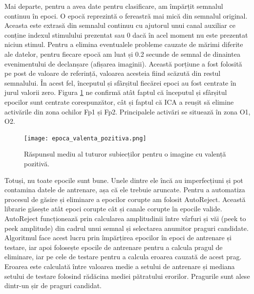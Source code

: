 Mai departe, pentru a avea date pentru clasificare, am împărțit semnalul continuu în epoci. O epocă reprezintă o fereastră mai mică din semnalul original. Aceasta este extrasă din semnalul continuu cu ajutorul unui canal auxiliar ce conține indexul stimulului prezentat sau 0 dacă în acel moment nu este prezentat niciun stimul. Pentru a elimina eventualele probleme cauzate de mărimi diferite ale datelor, pentru fiecare epocă am luat și 0.2 secunde de semnal de dinaintea evenimentului de declanșare (afișarea imaginii). Această porțiune a fost folosită pe post de valoare de referință, valoarea acesteia fiind scăzută din restul semnalului. În acest fel, începutul și sfârșitul fiecărei epoci au fost centrate în jurul valorii zero. Figura \ref{fig:raspuns_mediu} ne confirmă atât faptul că începutul și sfârșitul epocilor sunt centrate corespunzător, cât și faptul că ICA a reușit să elimine activările din zona ochilor Fp1 și Fp2. Principalele activări se situează în zona O1, O2.

\begin{figure}[H]
    \centering
		\vspace{-1em}
    \texttt{[image: epoca\_valenta\_pozitiva.png]}
    \caption{Răspunsul mediu al tuturor subiecților pentru o imagine cu valență pozitivă.}
		\vspace{-1em}
    \label{fig:raspuns_mediu}
\end{figure}

Totuși, nu toate epocile sunt bune. Unele dintre ele încă au imperfecțiuni și pot contamina datele de antrenare, așa că ele trebuie aruncate. Pentru a automatiza procesul de găsire și eliminare a epocilor corupte am folosit AutoReject\cite{AutoReject}. Această librarie găsește atât epoci corupte cât și canale corupte în epocile valide. AutoReject funcționează prin calcularea amplitudinii între vârfuri și văi (peek to peek amplitude) din cadrul unui semnal și selectarea anumitor praguri candidate. Algoritmul face acest lucru prin împărțirea epocilor în epoci de antrenare și testare, iar apoi folosește epocile de antrenare pentru a calcula pragul de eliminare, iar pe cele de testare pentru a calcula eroarea cauzată de acest prag. Eroarea este calculată între valoarea medie a setului de antrenare și mediana setului de testare folosind rădăcina mediei pătratului erorilor. Pragurile sunt alese dintr-un șir de praguri candidat.

